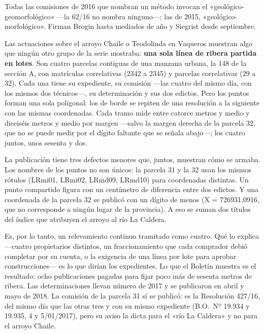 Todas las comisiones de 2016 que nombran un método invocan el «geológico-geomorfológico» ---la 62/16 no nombra ninguno---; las de 2015, «geológico-morfológico». Firman Brogin hasta mediados de año y Siegrist desde septiembre.

\begin{cautela}
Las actuaciones sobre el arroyo Chaile o Teodolinda en Vaqueros muestran algo que ningún otro grupo de la serie mostraba: \textbf{una sola línea de ribera partida en lotes}. Son cuatro parcelas contiguas de una manzana urbana, la 148 de la sección A, con matrículas correlativas (2342 a 2345) y parcelas correlativas (29 a 32). Cada una tiene su expediente, su comisión ---las cuatro del mismo día, con los mismos dos técnicos---, su determinación y sus dos edictos. Pero los puntos forman una sola poligonal: los de borde se repiten de una resolución a la siguiente con las mismas coordenadas. Cada tramo mide entre catorce metros y medio y dieciséis metros y medio por margen ---salvo la margen derecha de la parcela 32, que no se puede medir por el dígito faltante que se señala abajo---; los cuatro juntos, unos sesenta y dos.

La publicación tiene tres defectos menores que, juntos, muestran cómo se armaba. Los nombres de los puntos no son únicos: la parcela 31 y la 32 usan los mismos rótulos (LRmi01, LRmi02, LRmd09, LRmd10) para coordenadas distintas. Un punto compartido figura con un centímetro de diferencia entre dos edictos. Y una coordenada de la parcela 32 se publicó con un dígito de menos (X = 726931,0916, que no corresponde a ningún lugar de la provincia). A eso se suman dos títulos del índice que atribuyen el arroyo al río La Caldera.

Es, por lo tanto, un relevamiento continuo tramitado como cuatro. Qué lo explica ---cuatro propietarios distintos, un fraccionamiento que cada comprador debió completar por su cuenta, o la exigencia de una línea por lote para aprobar construcciones--- es lo que dirían los expedientes. Lo que el Boletín muestra es el resultado: ocho publicaciones pagadas para fijar poco más de sesenta metros de ribera. Las determinaciones llevan número de 2017 y se publicaron en abril y mayo de 2018. La comisión de la parcela 31 sí se publicó: es la Resolución 427/16, del mismo día que las otras tres y con su mismo expediente (B.O.\ Nº 19.934 y 19.935, 4 y 5/01/2017), pero su aviso la dicta para el «río La Caldera» y no para el arroyo Chaile. 
\end{cautela}

